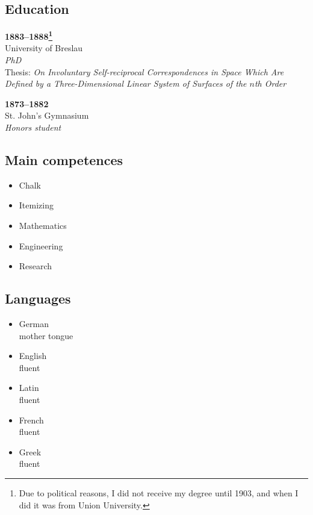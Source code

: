 \documentclass[a4paper]{article}
\newenvironment{ITEMIZE}{\vspace{-\topsep}\begin{itemize}}{\end{itemize}}
\begin{document}
\subsection*{Education}
\textbf{1883--1888\footnote{%
  Due to political reasons, I did not receive my degree until 1903, and when I
  did it was from Union University.%
}}                                                                            \\
University of Breslau                                                         \\
\textit{PhD}                                                                  \\
Thesis:\@ \textit{%
  On Involuntary Self-reciprocal Correspondences in Space Which Are Defined by a
  Three-Dimensional Linear System of Surfaces of the $n$th Order%
}
\par
\textbf{1873--1882}  \\
St. John's Gymnasium \\
\textit{Honors student}
\subsection*{Main competences}
\begin{ITEMIZE}
  \item%
  Chalk
  \item%
  Itemizing
  \item%
  Mathematics
  \item%
  Engineering
  \item%
  Research
\end{ITEMIZE}
\subsection*{Languages}
\begin{ITEMIZE}
  \item%
  German\\
  mother tongue
  \item%
  English\\
  fluent
  \item%
  Latin\\
  fluent
  \item%
  French\\
  fluent
  \item%
  Greek\\
  fluent
\end{ITEMIZE}
\end{document}
